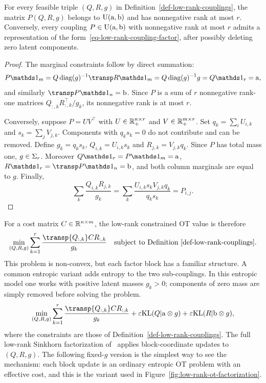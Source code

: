 \begin{prop}\label{prop-low-rank-factorization}
	For every feasible triple $(Q,R,g)$ in Definition~\ref{def-low-rank-couplings}, the matrix $P(Q,R,g)$ belongs to $\mathrm{U}(\mathrm{a},\mathrm{b})$ and has nonnegative rank at most $r$. Conversely, every coupling $P\in\mathrm{U}(\mathrm{a},\mathrm{b})$ with nonnegative rank at most $r$ admits a representation of the form~\eqref{eq-low-rank-coupling-factor}, after possibly deleting zero latent components.
\end{prop}

\begin{proof}
	The marginal constraints follow by direct summation:
	\[
		P\ones_m=Q\diag(g)^{-1}\transp R\ones_m
		=Q\diag(g)^{-1}g=Q\ones_r=\a,
	\]
	and similarly $\transp P\ones_n=\b$. Since $P$ is a sum of $r$ nonnegative rank-one matrices $Q_{:,k}R_{:,k}^\top/g_k$, its nonnegative rank is at most $r$.

	Conversely, suppose $P=UV^\top$ with $U\in\mathbb{R}_+^{n\times r}$ and $V\in\mathbb{R}_+^{m\times r}$. Set $q_k=\sum_i U_{i,k}$ and $s_k=\sum_j V_{j,k}$. Components with $q_ks_k=0$ do not contribute and can be removed. Define $g_k=q_ks_k$, $Q_{i,k}=U_{i,k}s_k$ and $R_{j,k}=V_{j,k}q_k$. Since $P$ has total mass one, $g\in\Sigma_r$. Moreover $Q\ones_r=P\ones_m=\a$, $R\ones_r=\transp P\ones_n=\b$, and both column marginals are equal to $g$. Finally,
	\[
		\sum_k\frac{Q_{i,k}R_{j,k}}{g_k}
		=
		\sum_k\frac{U_{i,k}s_kV_{j,k}q_k}{q_ks_k}
		=P_{i,j}.
	\]
\end{proof}

For a cost matrix $C\in\mathbb{R}^{n\times m}$, the low-rank constrained OT value is therefore
\[
	\min_{(Q,R,g)}
	\sum_{k=1}^r \frac{\transp{Q_{:,k}} C R_{:,k}}{g_k}
	\quad\text{subject to Definition~\ref{def-low-rank-couplings}.}
\]
This problem is non-convex, but each factor block has a familiar structure. A common entropic variant adds entropy to the two sub-couplings. In this entropic model one works with positive latent masses $g_k>0$; components of zero mass are simply removed before solving the problem.
\begin{equation}\label{eq-low-rank-entropic-ot}
	\min_{(Q,R,g)}
	\sum_{k=1}^r \frac{\transp{Q_{:,k}} C R_{:,k}}{g_k}
	+
	\epsilon\KLD(Q|\a\otimes g)
	+
	\epsilon\KLD(R|\b\otimes g),
\end{equation}
where the constraints are those of Definition~\ref{def-low-rank-couplings}. The full low-rank Sinkhorn factorization of~\cite{scetbon2021lowrank} applies block-coordinate updates to $(Q,R,g)$. The following fixed-$g$ version is the simplest way to see the mechanism: each block update is an ordinary entropic OT problem with an effective cost, and this is the variant used in Figure~\ref{fig:low-rank-ot-factorization}.


